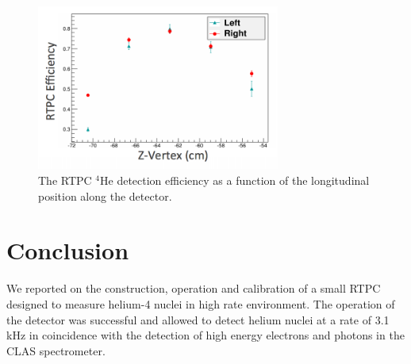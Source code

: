 \documentclass[twocolumn,showpacs,superscriptaddress,groupedaddress]{revtex4}
\begin{document}
\begin{figure}[tb]
\centering
\includegraphics[width=8cm]{fig/tpceff.png}
\caption{The RTPC $^4$He detection efficiency as a function of the longitudinal 
   position along the detector.
 \label{fig:rtpc_eff}}
 \end{figure}


\section{Conclusion}

We reported on the construction, operation and calibration of a small RTPC 
designed to measure helium-4 nuclei in high rate environment. The operation
of the detector was successful and allowed to detect helium nuclei at a rate
of 3.1 kHz in coincidence with the detection of high energy electrons and 
photons in the CLAS spectrometer. 

  
\end{document}
